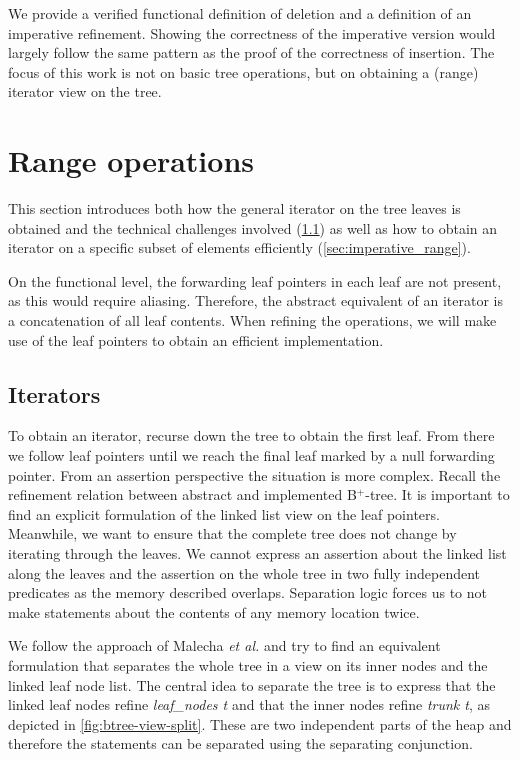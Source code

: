 \documentclass[runningheads]{llncs}
\newcommand{\btree}{B$^+$-tree}
\begin{document}
We provide a verified functional definition of deletion and a definition of an imperative refinement.
Showing the correctness of the imperative version would largely follow
the same pattern as the proof of the correctness of insertion.
The focus of this work is not on basic tree operations, but on obtaining a (range) iterator view on the tree.


\section{Range operations}
\label{sec:range}

This section introduces both how the general iterator
on the tree leaves is obtained and the technical challenges involved
(\cref{sec:imperative_iter})
as well as how to obtain an iterator on a specific
subset of elements efficiently (\cref{sec:imperative_range}).

On the functional level, the forwarding leaf pointers in each leaf
are not present, as this would require aliasing.
Therefore, the abstract equivalent of an iterator
is a concatenation of all leaf contents.
When refining the operations, we will make use of the leaf pointers
to obtain an efficient implementation.

\subsection{Iterators}
\label{sec:imperative_iter}

To obtain an iterator, recurse down the tree to obtain the first leaf.
From there we follow leaf pointers until we reach the final leaf marked by a null forwarding pointer.
From an assertion perspective the situation is more complex.
Recall the refinement relation between abstract and implemented \btree.
It is important to find an explicit formulation of the linked list view on the leaf pointers.
Meanwhile, we want to ensure that the complete tree does not change by iterating through the leaves.
We cannot express an assertion about the linked list along the leaves
and the assertion on the whole tree in two fully independent predicates
as the memory described overlaps.
Separation logic forces us to not make statements about the contents of
any memory location twice.

We follow the approach of Malecha \emph{et al.} \cite{DBLP:conf/popl/MalechaMSW10} and
try to find an equivalent formulation that separates the whole tree in a
view on its inner nodes and the linked leaf node list.
The central idea to separate the tree is to
express that the linked leaf nodes refine \emph{leaf\_nodes t}
and that the inner nodes refine \emph{trunk t}, as depicted in \cref{fig:btree-view-split}.
These are two independent parts of the heap and therefore
the statements can be separated using the separating conjunction.
\end{document}
